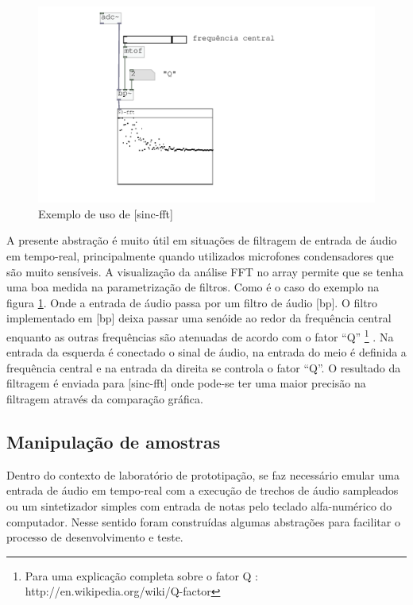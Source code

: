 \documentclass{ppgmus}
\begin{document}
\begin{figure}
\includegraphics[scale=.55]{sinc-fft-help}
\caption{Exemplo de uso de [sinc-fft]}
\label{sinc-fft-help}
\end{figure}


A presente abstração é muito útil em situações de filtragem de entrada de áudio em tempo-real, principalmente
quando utilizados microfones condensadores que são muito sensíveis.
A visualização da análise FFT no array permite que se tenha uma boa medida na parametrização de filtros.
Como é o caso do exemplo na figura \ref{sinc-fft-help}. Onde a entrada de áudio passa por um filtro
de áudio [bp\texttildelow]. O filtro implementado em [bp\texttildelow] deixa passar uma senóide ao
redor da frequência central enquanto as outras frequências são atenuadas de acordo com o fator ``Q''
\footnote{Para uma explicação completa sobre o fator Q : http://en.wikipedia.org/wiki/Q-factor} .
Na entrada da esquerda é conectado o sinal de áudio, na entrada do meio é definida a frequência central e na
entrada da direita se controla o fator ``Q''. O resultado da filtragem é enviada para [sinc-fft] onde 
pode-se ter uma maior precisão na filtragem através da comparação gráfica.

 

\subsection{Manipulação de amostras}


  Dentro do  contexto de laboratório de prototipação, se faz necessário emular uma entrada 
de áudio em tempo-real com a execução de trechos de áudio sampleados ou um sintetizador simples
com entrada de notas pelo teclado alfa-numérico do computador. Nesse sentido foram construídas
algumas abstrações para facilitar o processo de desenvolvimento e teste.
\end{document}
